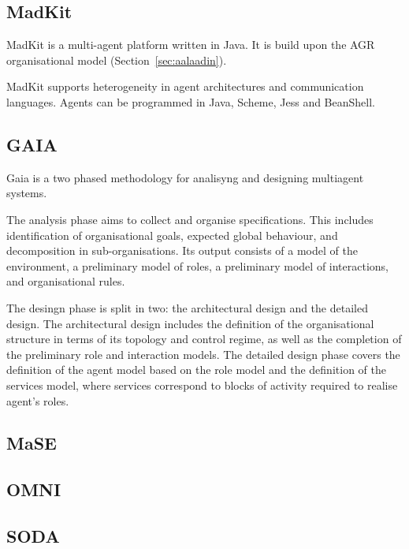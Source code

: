 \documentclass{article}
\begin{document}
\subsection{MadKit} 

MadKit \cite{conf/agents/GutknechtF00a} is a multi-agent platform written in Java. It is build upon the AGR
organisational model (Section~\ref{sec:aalaadin}).

MadKit supports heterogeneity in agent architectures and communication
languages. Agents can be programmed in Java, Scheme, Jess and BeanShell.

\subsection{GAIA}

Gaia \cite{journals/aamas/WooldridgeJK00} is a two phased methodology for analisyng and designing multiagent
systems.

The analysis phase aims to collect and organise specifications. This includes
identification of organisational goals, expected global behaviour, and
decomposition in sub-organisations. Its output consists of a model of the
environment, a preliminary model of roles, a preliminary model of interactions,
and organisational rules.

The desingn phase is split in two: the architectural design and the detailed
design. The architectural design includes the definition of the organisational
structure in terms of its topology and control regime, as well as the
completion of the preliminary role and interaction models. The detailed design
phase covers the definition of the agent model based on the role model and the
definition of the services model, where services correspond to blocks of
activity required to realise agent's roles.

\cite{BlakeG05}
\cite{conf/aose/WooldridgeC00}

\subsection{MaSE}

\cite{deloach2004mase}

\subsection{OMNI}

\cite{journals/aamas/Vazquez-SalcedaDD05}

\subsection{SODA}
\end{document}
